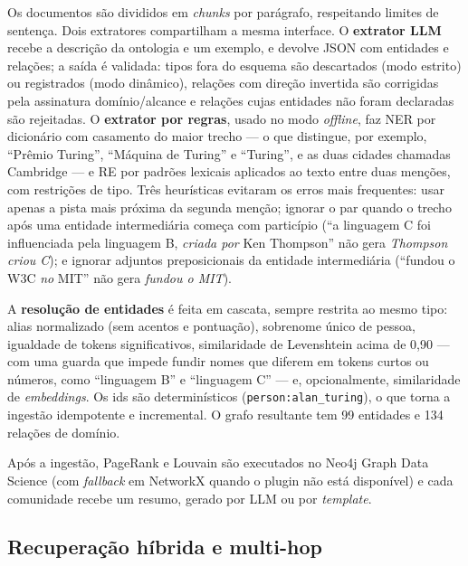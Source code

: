 \documentclass[12pt]{article}
\begin{document}
Os documentos são divididos em \textit{chunks} por parágrafo, respeitando limites de sentença. Dois extratores compartilham a mesma interface. O \textbf{extrator LLM} recebe a descrição da ontologia e um exemplo, e devolve JSON com entidades e relações; a saída é validada: tipos fora do esquema são descartados (modo estrito) ou registrados (modo dinâmico), relações com direção invertida são corrigidas pela assinatura domínio/alcance e relações cujas entidades não foram declaradas são rejeitadas. O \textbf{extrator por regras}, usado no modo \textit{offline}, faz NER por dicionário com casamento do maior trecho --- o que distingue, por exemplo, ``Prêmio Turing'', ``Máquina de Turing'' e ``Turing'', e as duas cidades chamadas Cambridge --- e RE por padrões lexicais aplicados ao texto entre duas menções, com restrições de tipo. Três heurísticas evitaram os erros mais frequentes: usar apenas a pista mais próxima da segunda menção; ignorar o par quando o trecho após uma entidade intermediária começa com particípio (``a linguagem C foi influenciada pela linguagem B, \textit{criada por} Ken Thompson'' não gera \textit{Thompson criou C}); e ignorar adjuntos preposicionais da entidade intermediária (``fundou o W3C \textit{no} MIT'' não gera \textit{fundou o MIT}).

A \textbf{resolução de entidades} é feita em cascata, sempre restrita ao mesmo tipo: alias normalizado (sem acentos e pontuação), sobrenome único de pessoa, igualdade de tokens significativos, similaridade de Levenshtein acima de 0,90 --- com uma guarda que impede fundir nomes que diferem em tokens curtos ou números, como ``linguagem B'' e ``linguagem C'' --- e, opcionalmente, similaridade de \textit{embeddings}. Os ids são determinísticos (\texttt{person:alan\_turing}), o que torna a ingestão idempotente e incremental. O grafo resultante tem 99 entidades e 134 relações de domínio.

Após a ingestão, PageRank e Louvain são executados no Neo4j Graph Data Science (com \textit{fallback} em NetworkX quando o plugin não está disponível) e cada comunidade recebe um resumo, gerado por LLM ou por \textit{template}.

\subsection{Recuperação híbrida e multi-hop}
\end{document}
